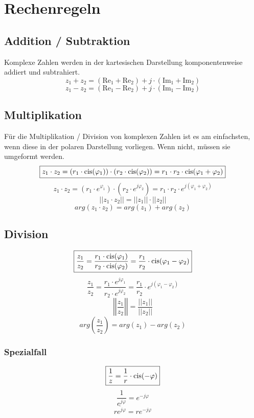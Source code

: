 \section{Rechenregeln}

\subsection{Addition / Subtraktion}
Komplexe Zahlen werden in der kartesischen Darstellung komponentenweise addiert 
und subtrahiert. 
\[ \boxed{z_1 + z_2 = (\text{Re}_1 + \text{Re}_2) + j\cdot (\text{Im}_1 + \text{Im}_2) } \]
\[ \boxed{z_1 - z_2 = (\text{Re}_1 - \text{Re}_2) + j\cdot (\text{Im}_1 - \text{Im}_2) } \]

\subsection{Multiplikation}
Für die Multiplikation / Division von komplexen Zahlen ist es am einfachsten, 
wenn diese in der polaren Darstellung vorliegen. Wenn nicht, müssen sie 
umgeformt werden. 
\[ \boxed{z_1 \cdot z_2 
= (r_1 \cdot \operatorname{cis}(\varphi_1)) \cdot (r_2 \cdot \operatorname{cis}(\varphi_2)) 
= r_1 \cdot r_2 \cdot \operatorname{cis}(\varphi_1 + \varphi_2)} \]
\[ \boxed{z_1 \cdot z_2 
= (r_1 \cdot e^{\varphi_1}) \cdot (r_2 \cdot e^{j \varphi_2}) 
= r_1 \cdot r_2 \cdot e^{j (\varphi_1 + \varphi_2)}} \]
\[ \boxed{|| z_1 \cdot z_2 || = || z_1 || \cdot || z_2 ||} \]
\[ \boxed{arg(z_1 \cdot z_2) = arg(z_1) + arg(z_2)} \]

\subsection{Division}
\[ \boxed{\frac{z_1}{z_2} 
= \frac{r_1 \cdot \operatorname{cis}(\varphi_1)}{r_2 \cdot \operatorname{cis}(\varphi_2)}
= \frac{r_1}{r_2} \cdot \operatorname{cis}(\varphi_1 - \varphi_2)} \]
\[ \boxed{\frac{z_1}{z_2} 
= \frac{r_1 \cdot e^{j \varphi_1}}{r_2 \cdot e^{j \varphi_2}}
= \frac{r_1}{r_2} \cdot e^{j (\varphi_1 - \varphi_2)}} \]
\[ \boxed{\left|\left| \frac{z_1}{z_2} \right|\right| 
= \frac{|| z_1 ||}{|| z_2 ||}} \]
\[ \boxed{arg\left(\frac{z_1}{z_2}\right) = arg(z_1) - arg(z_2)} \]

\subsubsection{Spezialfall}
\[ \boxed{\frac{1}{z} = \frac{1}{r} \cdot \operatorname{cis}(-\varphi)} \]
\[ \boxed{\frac{1}{e^{j \varphi}} = e^{-j\varphi}} \]
\[ \boxed{\overline{r e^{j\varphi}} = r e^{-j\varphi}} \]

